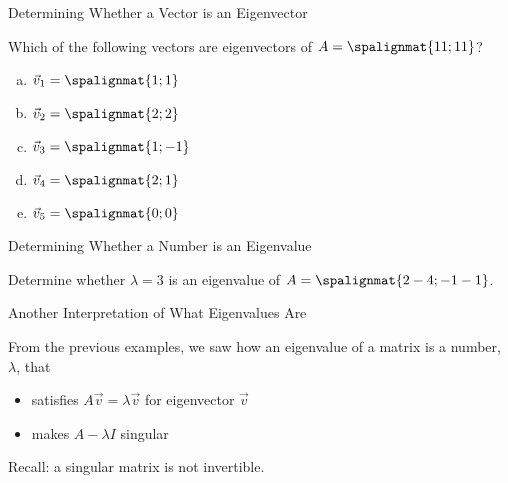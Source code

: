 \begin{frame}{Determining Whether a Vector is an Eigenvector}

    Which of the following vectors are eigenvectors of $A=\spalignmat{ 1 1 ; 1 1}$? 

    \begin{enumerate}[a)]
        \item $\vec v_1 = \spalignmat{1;1}$ 
        \item $\vec v_2 = \spalignmat{2;2}$ 
        \item $\vec v_3 = \spalignmat{1;-1}$ 
        \item $\vec v_4 = \spalignmat{2;1}$ 
        \item $\vec v_5 = \spalignmat{0;0}$
    \end{enumerate}

\end{frame}


\begin{frame}{Determining Whether a Number is an Eigenvalue}

    Determine whether $\lambda =3$ is an eigenvalue of $A=\spalignmat{2 -4 ; -1 -1}$. 


\end{frame}


\begin{frame}{Another Interpretation of What Eigenvalues Are}

    From the previous examples, we saw how an eigenvalue of a matrix is a number, $\lambda$, that
    
    \pause 
    \begin{itemize}
        \item satisfies $A\vec v = \lambda \vec v$ for eigenvector $\vec v$
        \item makes $A - \lambda I$ singular
    \end{itemize}

    \pause 
    Recall: a singular matrix is not invertible. 

\end{frame}



